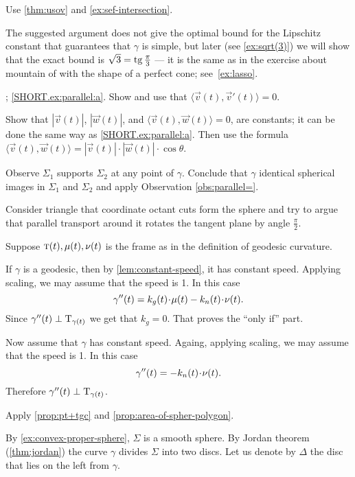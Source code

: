  Use \ref{thm:usov} and \ref{ex:sef-intersection}.

The suggested argument does not give the optimal bound for the Lipschitz constant that guarantees that $\gamma$ is simple, but
later (see \ref{ex:sqrt(3)}) we will show that the exact bound is $\sqrt{3}=\operatorname{tg}\tfrac\pi3$ --- it is the same as in the exercise about mountain of with the shape of a perfect cone; see~\ref{ex:lasso}.

\parbf{\ref{ex:parallel}}; \ref{SHORT.ex:parallel:a}.
Show and use that $\langle\vec v(t),\vec v'(t)\rangle=0$.

\parit{\ref{SHORT.ex:parallel:b}}
Show that $|\vec v(t)|$, $|\vec w(t)|$, and
$\langle\vec v(t),\vec w(t)\rangle=0$,
are constants; it can be done the same way as \ref{SHORT.ex:parallel:a}.
Then use the formula 
$\langle\vec v(t),\vec w(t)\rangle=|\vec v(t)|\cdot|\vec w(t)|\cdot\cos\theta$.

\setcounter{eqtn}{0}

Observe $\Sigma_1$ supports $\Sigma_2$ at any point of $\gamma$.
Conclude that $\gamma$ identical spherical images in $\Sigma_1$ and $\Sigma_2$ and apply Observation \ref{obs:parallel=}.

Consider triangle that coordinate octant cuts form the sphere and try to argue that parallel transport around it rotates the tangent plane by angle $\tfrac\pi 2$. 

Suppose $\text{\sc{t}}(t),\mu(t),\nu(t)$ is the frame as in the definition of geodesic curvature.

If $\gamma$ is a geodesic, then by \ref{lem:constant-speed}, it has constant speed.
Applying scaling, we may assume that the speed is 1.
In this case 
\[\gamma''(t)=k_g(t)\cdot \mu(t)-k_n(t)\cdot \Norm(t).\]
Since $\gamma''(t)\perp\mathrm{T}_{\gamma(t)}$ we get that $k_g=0$. 
That proves the ``only if'' part.

Now assume that $\gamma$ has constant speed.
Againg, applying scaling, we may assume that the speed is 1.
In this case 
\[\gamma''(t)=-k_n(t)\cdot \Norm(t).\]
Therefore $\gamma''(t)\perp\mathrm{T}_{\gamma(t)}$.

\setcounter{eqtn}{0}

Apply \ref{prop:pt+tgc} and \ref{prop:area-of-spher-polygon}.

By \ref{ex:convex-proper-sphere}, $\Sigma$ is a smooth sphere.
By Jordan theorem (\ref{thm:jordan}) the curve $\gamma$ divides $\Sigma$  into two discs.
Let us denote by $\Delta$ the disc that lies on the left from $\gamma$.

